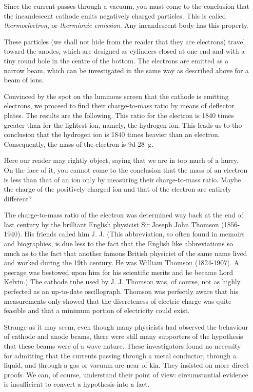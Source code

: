 Since the current passes through a vacuum, you must come to the conclusion that the incandescent cathode emits negatively charged particles. This is called \emph{thermoelectron}, or \emph{thermionic emission}. Any incandescent body has this property.

These particles (we shall not hide from the reader that they are electrons) travel toward the anodes, which are designed as cylinders closed at one end and with a tiny round hole in the centre of the bottom. The electrons are emitted as a narrow beam, which can be investigated in the same way as described above for a beam of ions.

Convinced by the spot on the luminous screen that the cathode is emitting electrons, we proceed to find their charge-to-mass ratio by means of deflector plates. The results are the following. This ratio for the electron is 1840 times greater than for the lightest ion, namely, the hydrogen ion. This leads us to tho conclusion that the hydrogen ion is 1840 times heavier than an electron. Consequently, the mass of the electron is \SI{9d-28}{\gram}. 

Here our reader may rightly object, saying that we are in too much of a hurry. On the face of it, you cannot come to the conclusion that the mass of an electron is less than that of an ion only by measuring their charge-to-mass ratio. Maybe the charge of the positively charged ion and that of the electron are entirely different?

The charge-to-mass ratio of the electron was determined way back at the end of last century by the brilliant English physicist Sir Joseph John Thomson (1856-1940). His friends called him J. J. (This abbreviation, so often found in memoirs and biographies, is due less to the fact that the English like abbreviations so much as to the fact that another famous British physicist of the same name lived and worked during the 19th century. He was William Thomson (1824-1907). A peerage was bestowed upon him for his scientific merits and he became Lord Kelvin.) The cathode tube used by J. J. Thomson was, of course, not as highly perfected as an up-to-date oscillograph. Thomson was perfectly aware that his measurements only showed that the discreteness of electric charge was quite feasible and that a minimum portion of electricity could exist.

Strange as it may seem, even though many physicists had observed the behaviour of cathode and anode beams, there were still many supporters of the hypothesis that these beams were of a wave nature. These investigators found no necessity for admitting that the currents passing through a metal conductor, through a liquid, and through a gas or vacuum are near of kin. They insisted on more direct proofs. We can, of course, understand their point of view: circumstantial evidence is insufficient to convert a hypothesis into a fact.

